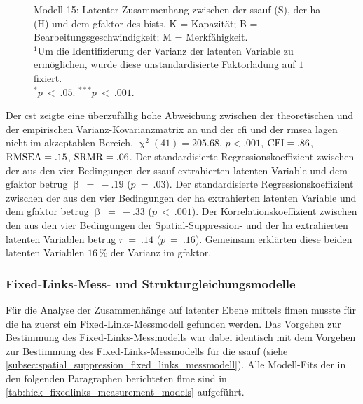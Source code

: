 \documentclass[11pt, twoside, a4paper]{book}		%
\begin{document}
\begin{figure}[b]
\begin{adjustbox}{width=1\textwidth, keepaspectratio}
\begin{tikzpicture}
		\end{tikzpicture}
	\end{adjustbox}
	\vspace{.2cm}
	\caption[Modell 15: Strukturgleichungsmodell zur Vorhersage des \gls{gfaktor}s durch die Spa\-ti\-al-Sup\-pres\-sion- und die \gls{ha}]{Modell 15: Latenter Zusammenhang zwischen der \gls{ssauf} (\textsf{S}), der \gls{ha} (\textsf{H}) und dem \gls{gfaktor} des \gls{bist}s. \textsf{K} = Kapazität; \textsf{B} = Bearbeitungsgeschwindigkeit; \textsf{M} = Merkfähigkeit.\\
		$^1$Um die Identifizierung der Varianz der latenten Variable zu ermöglichen, wurde diese unstandardisierte Faktorladung auf $1$ fixiert.\\
		$^{*}p~<~.05$. $^{***}p~<~.001$.}
	\label{fig:spatial_suppression_hick_g_model}
\end{figure}
Der \gls{cst} zeigte eine überzufällig hohe Abweichung zwischen der theoretischen und der empirischen Var\-ianz-Ko\-var\-ianz\-ma\-trix an und der \gls{cfi} und der \gls{rmsea} lagen nicht im akzeptablen Bereich, $\upchi^2(41)=205.68$, $p<.001$, $\textnormal{CFI}=.86$, $\textnormal{RMSEA}=.15$, $\textnormal{SRMR}=.06$. 
Der standardisierte Regressionskoeffizient zwischen der aus den vier Bedingungen der \gls{ssauf} extrahierten latenten Variable und dem \gls{gfaktor} betrug $\upbeta~=~-.19$ ($p~=~.03$). Der standardisierte Regressionskoeffizient zwischen der aus den vier Bedingungen der \gls{ha} extrahierten latenten Variable und dem \gls{gfaktor} betrug $\upbeta~=~-.33$ ($p~<~.001$). Der Korrelationskoeffizient zwischen den aus den vier Bedingungen der Spatial-Suppression- und der \gls{ha} extrahierten latenten Variablen betrug $r~=~.14$ ($p~=~.16$). Gemeinsam erklärten diese beiden latenten Variablen $16\,\%$ der Varianz im \gls{gfaktor}.




\subsubsection*{Fixed-Links-Mess- und Strukturgleichungsmodelle}

Für die Analyse der Zusammenhänge auf latenter Ebene mittels \gls{flm}en musste für die \gls{ha} zuerst ein Fixed-Links\--Mess\-modell gefunden werden. Das Vorgehen zur Bestimmung des Fixed-Links-Mess\-mod\-el\-ls war dabei identisch mit dem Vorgehen zur Bestimmung des Fixed-Links-Mess\-mod\-el\-ls für die \gls{ssauf} (siehe \autoref{subsec:spatial_suppression_fixed_links_messmodell}). Alle Modell-Fits der in den folgenden Paragraphen berichteten \gls{flm}e sind in \autoref{tab:hick_fixedlinks_measurement_models} aufgeführt.
\end{document}
